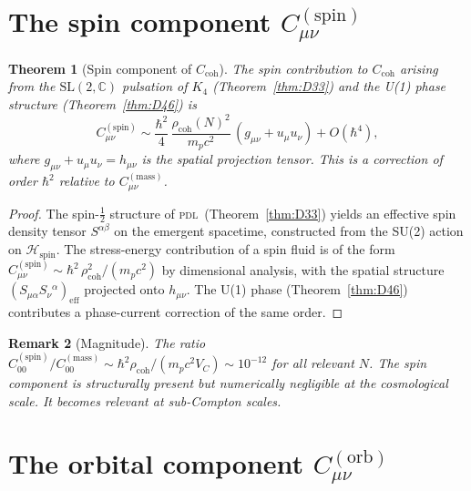 \documentclass[12pt,a4paper]{article}
\newtheorem{theorem}{Theorem}[section]
\newtheorem{remark}[theorem]{Remark}
\newcommand{\Kfour}{K_4}
\newcommand{\hb}{\hbar}
\newcommand{\PDL}{\textsc{pdl}}
\newcommand{\Ccoh}{C_{\mathrm{coh}}}
\newcommand{\Cmass}{C^{(\mathrm{mass})}}
\newcommand{\Cspin}{C^{(\mathrm{spin})}}
\newcommand{\Corb}{C^{(\mathrm{orb})}}
\newcommand{\rhocoh}{\rho_{\mathrm{coh}}}
\newcommand{\VC}{V_C}
\begin{document}
\section{The spin component \texorpdfstring{$\Cspin_{\mu\nu}$}{C(spin)}}
\label{sec:Cspin}

\begin{theorem}[Spin component of $\Ccoh$]
\label{thm:Cspin}
The spin contribution to $\Ccoh$ arising from the $\mathrm{SL}(2,\mathbb{C})$ pulsation of $\Kfour$ (Theorem~\ref{thm:D33}) and the U(1) phase structure (Theorem~\ref{thm:D46}) is
\begin{equation}
\Cspin_{\mu\nu} \sim \frac{\hb^2}{4}\,\frac{\rhocoh(N)^2}{m_p c^2}\,(g_{\mu\nu} + u_\mu u_\nu) + O(\hb^4),
\label{eq:Cspin}
\end{equation}
where $g_{\mu\nu} + u_\mu u_\nu = h_{\mu\nu}$ is the spatial projection tensor. This is a correction of order $\hb^2$ relative to $\Cmass_{\mu\nu}$.
\end{theorem}

\begin{proof}
The spin-$\tfrac{1}{2}$ structure of \PDL\ (Theorem~\ref{thm:D33}) yields an effective spin density tensor $S^{\alpha\beta}$ on the emergent spacetime, constructed from the SU(2) action on $\mathcal{H}_{\mathrm{spin}}$. The stress-energy contribution of a spin fluid is of the form $C^{(\mathrm{spin})}_{\mu\nu} \sim \hb^2\,\rho^2_{\mathrm{coh}}/(m_p c^2)$ by dimensional analysis, with the spatial structure $(S_{\mu\alpha}S_\nu{}^\alpha)_{\mathrm{eff}}$ projected onto $h_{\mu\nu}$. The U(1) phase (Theorem~\ref{thm:D46}) contributes a phase-current correction of the same order.
\end{proof}

\begin{remark}[Magnitude]
The ratio $\Cspin_{00}/\Cmass_{00} \sim \hb^2\rhocoh/(m_p c^2 \VC) \sim 10^{-12}$ for all relevant $N$. The spin component is structurally present but numerically negligible at the cosmological scale. It becomes relevant at sub-Compton scales.
\end{remark}

\section{The orbital component \texorpdfstring{$\Corb_{\mu\nu}$}{C(orb)}}
\label{sec:Corb}
\end{document}
